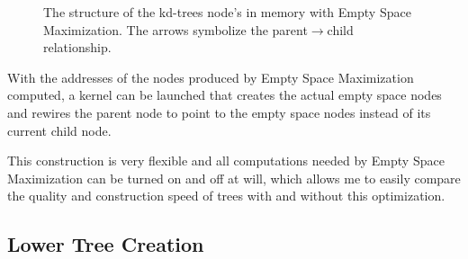 \begin{figure}
  \centering
  \caption[The structure of the kd-tree's nodes in memory with Empty Space
    Maximization.]{The structure of the kd-trees node's in memory with Empty
    Space Maximization. The arrows symbolize the parent$\rightarrow$child
    relationship.}
  \label{fig:emptyNodeStructure}
\end{figure}



With the addresses of the nodes produced by Empty Space Maximization computed, a
kernel can be launched that creates the actual empty space nodes and rewires the
parent node to point to the empty space nodes instead of its current child node.

This construction is very flexible and all computations needed by Empty Space
Maximization can be turned on and off at will, which allows me to easily compare
the quality and construction speed of trees with and without this optimization.

\subsection{Lower Tree Creation}\label{sec:lowerNodes}

